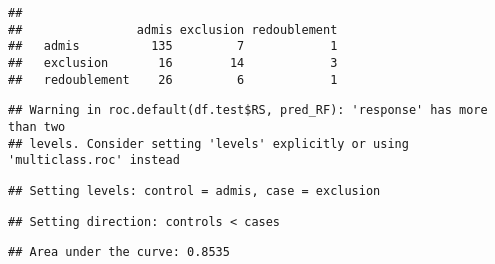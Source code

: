 \documentclass[
]{article}
\newenvironment{Shaded}{\begin{snugshade}}{\end{snugshade}}
\newcommand{\AttributeTok}[1]{\textcolor[rgb]{0.77,0.63,0.00}{#1}}
\newcommand{\DecValTok}[1]{\textcolor[rgb]{0.00,0.00,0.81}{#1}}
\newcommand{\DocumentationTok}[1]{\textcolor[rgb]{0.56,0.35,0.01}{\textbf{\textit{#1}}}}
\newcommand{\FunctionTok}[1]{\textcolor[rgb]{0.00,0.00,0.00}{#1}}
\newcommand{\NormalTok}[1]{#1}
\newcommand{\OtherTok}[1]{\textcolor[rgb]{0.56,0.35,0.01}{#1}}
\newcommand{\SpecialCharTok}[1]{\textcolor[rgb]{0.00,0.00,0.00}{#1}}
\newcommand{\StringTok}[1]{\textcolor[rgb]{0.31,0.60,0.02}{#1}}
\begin{document}
\begin{verbatim}
##               
##                admis exclusion redoublement
##   admis          135         7            1
##   exclusion       16        14            3
##   redoublement    26         6            1
\end{verbatim}

\begin{Shaded}
\end{Shaded}

\begin{verbatim}
## Warning in roc.default(df.test$RS, pred_RF): 'response' has more than two
## levels. Consider setting 'levels' explicitly or using 'multiclass.roc' instead
\end{verbatim}

\begin{verbatim}
## Setting levels: control = admis, case = exclusion
\end{verbatim}

\begin{verbatim}
## Setting direction: controls < cases
\end{verbatim}

\begin{Shaded}
\end{Shaded}

\begin{verbatim}
## Area under the curve: 0.8535
\end{verbatim}

\begin{Shaded}
\end{Shaded}
\end{document}
